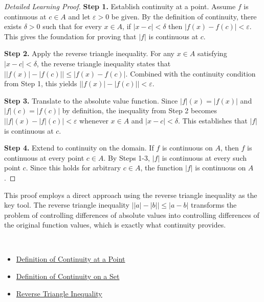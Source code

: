 \begin{proof}[Detailed Learning Proof]
\LRAProofBodyStart

\textbf{Step 1.} Establish continuity at a point. Assume $f$ is continuous at $c\in A$ and let $\varepsilon>0$ be given. By the definition of continuity, there exists $\delta>0$ such that for every $x\in A$, if $|x-c|<\delta$ then $|f(x)-f(c)|<\varepsilon$. This gives the foundation for proving that $|f|$ is continuous at $c$.

\textbf{Step 2.} Apply the reverse triangle inequality. For any $x\in A$ satisfying $|x-c|<\delta$, the reverse triangle inequality states that $\bigl||f(x)|-|f(c)|\bigr| \le |f(x)-f(c)|$. Combined with the continuity condition from Step 1, this yields $\bigl||f(x)|-|f(c)|\bigr| < \varepsilon$.

\textbf{Step 3.} Translate to the absolute value function. Since $|f|(x)=|f(x)|$ and $|f|(c)=|f(c)|$ by definition, the inequality from Step 2 becomes $\bigl||f|(x)-|f|(c)\bigr|<\varepsilon$ whenever $x\in A$ and $|x-c|<\delta$. This establishes that $|f|$ is continuous at $c$.

\textbf{Step 4.} Extend to continuity on the domain. If $f$ is continuous on $A$, then $f$ is continuous at every point $c\in A$. By Steps 1-3, $|f|$ is continuous at every such point $c$. Since this holds for arbitrary $c\in A$, the function $|f|$ is continuous on $A$.
\end{proof}

\begin{remark*}
This proof employs a direct approach using the reverse triangle inequality as the key tool. The reverse triangle inequality $\bigl||a|-|b|\bigr| \le |a-b|$ transforms the problem of controlling differences of absolute values into controlling differences of the original function values, which is exactly what continuity provides.
\end{remark*}

\begin{remark*}[Dependencies]~\\
\begin{itemize}
  \item \hyperref[def:continuous-at-point]{Definition of Continuity at a Point}
  \item \hyperref[def:continuity-on-set]{Definition of Continuity on a Set}
  \item \hyperref[thm:reverse-triangle-inequality]{Reverse Triangle Inequality}
\end{itemize}
\end{remark*}
